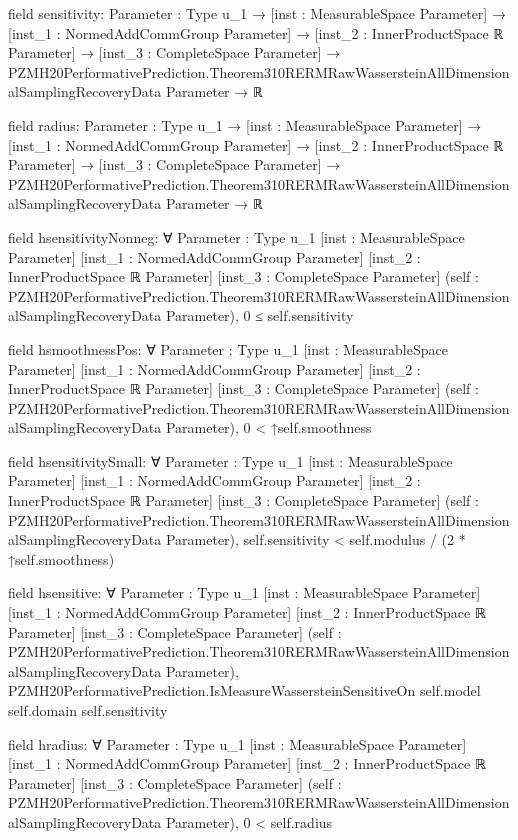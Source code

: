 \documentclass[10pt]{article}
\begin{document}
\begin{ReviewVerbatim}
field sensitivity:
{Parameter : Type u_1} →
  [inst : MeasurableSpace Parameter] →
    [inst_1 : NormedAddCommGroup Parameter] →
      [inst_2 : InnerProductSpace ℝ Parameter] →
        [inst_3 : CompleteSpace Parameter] →
          PZMH20PerformativePrediction.Theorem310RERMRawWassersteinAllDimensionalSamplingRecoveryData Parameter → ℝ

field radius:
{Parameter : Type u_1} →
  [inst : MeasurableSpace Parameter] →
    [inst_1 : NormedAddCommGroup Parameter] →
      [inst_2 : InnerProductSpace ℝ Parameter] →
        [inst_3 : CompleteSpace Parameter] →
          PZMH20PerformativePrediction.Theorem310RERMRawWassersteinAllDimensionalSamplingRecoveryData Parameter → ℝ

field hsensitivityNonneg:
∀ {Parameter : Type u_1} [inst : MeasurableSpace Parameter] [inst_1 : NormedAddCommGroup Parameter]
  [inst_2 : InnerProductSpace ℝ Parameter] [inst_3 : CompleteSpace Parameter]
  (self : PZMH20PerformativePrediction.Theorem310RERMRawWassersteinAllDimensionalSamplingRecoveryData Parameter),
  0 ≤ self.sensitivity

field hsmoothnessPos:
∀ {Parameter : Type u_1} [inst : MeasurableSpace Parameter] [inst_1 : NormedAddCommGroup Parameter]
  [inst_2 : InnerProductSpace ℝ Parameter] [inst_3 : CompleteSpace Parameter]
  (self : PZMH20PerformativePrediction.Theorem310RERMRawWassersteinAllDimensionalSamplingRecoveryData Parameter),
  0 < ↑self.smoothness

field hsensitivitySmall:
∀ {Parameter : Type u_1} [inst : MeasurableSpace Parameter] [inst_1 : NormedAddCommGroup Parameter]
  [inst_2 : InnerProductSpace ℝ Parameter] [inst_3 : CompleteSpace Parameter]
  (self : PZMH20PerformativePrediction.Theorem310RERMRawWassersteinAllDimensionalSamplingRecoveryData Parameter),
  self.sensitivity < self.modulus / (2 * ↑self.smoothness)

field hsensitive:
∀ {Parameter : Type u_1} [inst : MeasurableSpace Parameter] [inst_1 : NormedAddCommGroup Parameter]
  [inst_2 : InnerProductSpace ℝ Parameter] [inst_3 : CompleteSpace Parameter]
  (self : PZMH20PerformativePrediction.Theorem310RERMRawWassersteinAllDimensionalSamplingRecoveryData Parameter),
  PZMH20PerformativePrediction.IsMeasureWassersteinSensitiveOn self.model self.domain self.sensitivity

field hradius:
∀ {Parameter : Type u_1} [inst : MeasurableSpace Parameter] [inst_1 : NormedAddCommGroup Parameter]
  [inst_2 : InnerProductSpace ℝ Parameter] [inst_3 : CompleteSpace Parameter]
  (self : PZMH20PerformativePrediction.Theorem310RERMRawWassersteinAllDimensionalSamplingRecoveryData Parameter),
  0 < self.radius


\end{ReviewVerbatim}
\end{document}
